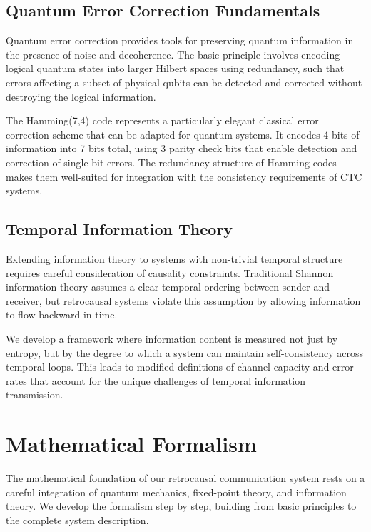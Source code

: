 \documentclass[12pt,a4paper]{article}
\begin{document}
\subsection{Quantum Error Correction Fundamentals}

Quantum error correction provides tools for preserving quantum information in the presence of noise and decoherence. The basic principle involves encoding logical quantum states into larger Hilbert spaces using redundancy, such that errors affecting a subset of physical qubits can be detected and corrected without destroying the logical information.

The Hamming(7,4) code represents a particularly elegant classical error correction scheme that can be adapted for quantum systems. It encodes 4 bits of information into 7 bits total, using 3 parity check bits that enable detection and correction of single-bit errors. The redundancy structure of Hamming codes makes them well-suited for integration with the consistency requirements of CTC systems.

\subsection{Temporal Information Theory}

Extending information theory to systems with non-trivial temporal structure requires careful consideration of causality constraints. Traditional Shannon information theory assumes a clear temporal ordering between sender and receiver, but retrocausal systems violate this assumption by allowing information to flow backward in time.

We develop a framework where information content is measured not just by entropy, but by the degree to which a system can maintain self-consistency across temporal loops. This leads to modified definitions of channel capacity and error rates that account for the unique challenges of temporal information transmission.

\section{Mathematical Formalism}

The mathematical foundation of our retrocausal communication system rests on a careful integration of quantum mechanics, fixed-point theory, and information theory. We develop the formalism step by step, building from basic principles to the complete system description.
\end{document}
